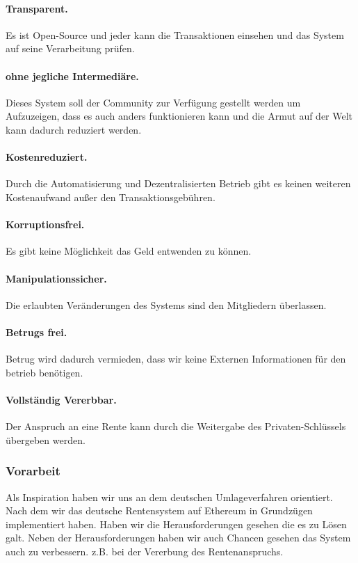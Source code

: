 \paragraph{Transparent.} Es ist Open-Source und jeder kann die Transaktionen einsehen und das System auf seine Verarbeitung prüfen.

\paragraph{ohne jegliche Intermediäre.} Dieses System soll der Community zur Verfügung gestellt werden um Aufzuzeigen, dass es auch anders funktionieren kann und die Armut auf der Welt kann dadurch reduziert werden.

\paragraph{Kostenreduziert.} Durch die Automatisierung und Dezentralisierten Betrieb gibt es keinen weiteren Kostenaufwand außer den Transaktionsgebühren.

\paragraph{Korruptionsfrei.} Es gibt keine Möglichkeit das Geld entwenden zu können.

\paragraph{Manipulationssicher.} Die erlaubten Veränderungen des Systems sind den Mitgliedern überlassen.

\paragraph{Betrugs frei.}
Betrug wird dadurch vermieden, dass wir keine Externen Informationen für den betrieb benötigen. 

\paragraph{Vollständig Vererbbar.}
Der Anspruch an eine Rente kann durch die Weitergabe des Privaten-Schlüssels übergeben werden.


\subsubsection{Vorarbeit}

Als Inspiration haben wir uns an dem deutschen Umlageverfahren orientiert. Nach dem wir das deutsche Rentensystem auf Ethereum in Grundzügen implementiert haben. Haben wir die Herausforderungen gesehen die es zu Lösen galt.
Neben der Herausforderungen haben wir auch Chancen gesehen das System auch zu verbessern. z.B. bei der Vererbung des Rentenanspruchs.
